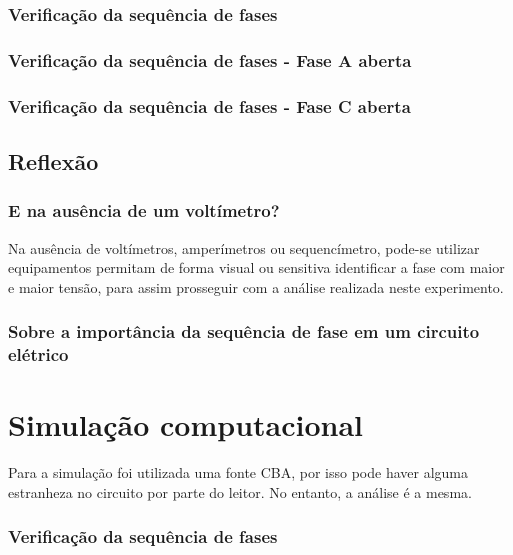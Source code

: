 \documentclass[a4paper,12pt,oneside,openany,table,xcdraw]{article}
\begin{document}
\subsubsection{Verificação da sequência de fases}

\subsubsection{Verificação da sequência de fases - Fase A aberta}

\subsubsection{Verificação da sequência de fases - Fase C aberta}

\subsection{Reflexão}
\subsubsection{E na ausência de um voltímetro?}
 Na ausência de voltímetros, amperímetros ou sequencímetro, pode-se utilizar equipamentos permitam de forma visual ou sensitiva identificar a fase com maior e maior tensão, para assim prosseguir com a análise realizada neste experimento. 

\subsubsection{Sobre a importância da sequência de fase em um circuito elétrico}


\newpage
\section{Simulação computacional} %
Para a simulação foi utilizada uma fonte CBA, por isso pode haver alguma estranheza no circuito por parte do leitor. No entanto, a análise é a mesma.
\vspace{0.2cm}

\subsubsection{Verificação da sequência de fases}
\end{document}
